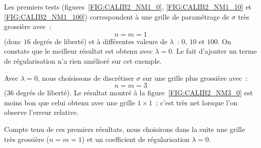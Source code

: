 Les premiers tests (figures~\ref{FIG:CALIB2_NM1_0}, 
\ref{FIG:CALIB2_NM1_10} et \ref{FIG:CALIB2_NM1_100}) correspondent 
\`a une grille de param\'etrage de $\sigma$ tr\`es grossi\`ere 
avec~:
$$
n = m = 1
$$
(donc $16$ degr\'es de libert\'e) et \`a diff\'erentes valeurs de 
$\lambda$~: $0$, $10$ et $100$. On constate que le meilleur 
r\'esultat est obtenu avec $\lambda = 0$. Le fait d'ajouter un 
terme de r\'egularisation n'a rien am\'elior\'e sur 
cet exemple.

Avec $\lambda = 0$, nous choisissons de discr\'etiser $\sigma$ 
sur une grille plus grossi\`ere avec~:
$$
n = m = 3
$$
($36$ degr\'es de libert\'e). Le r\'esultat montr\'e \`a la 
figure~\ref{FIG:CALIB2_NM3_0} est 
moins bon que celui obtenu avec une grille $1 \times 1$~; c'est 
tr\`es net lorsque l'on observe l'erreur relative.

Compte tenu de ces premiers r\'esultats, nous choisirons dans la 
suite une grille tr\`es grossi\`ere ($n = m = 1$) et un 
coefficient de r\'egularisation $\lambda = 0$.

\pagebreak

